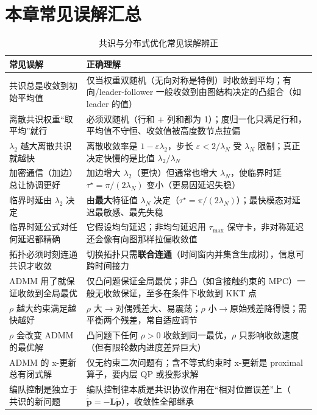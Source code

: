 \section*{本章常见误解汇总}

\begin{table}[H]\centering\small
\caption{共识与分布式优化常见误解辨正}
\label{tab:cs-misconceptions}
\begin{tabular}{p{6.0cm}p{8.2cm}}
\toprule
常见误解 & 正确理解 \\
\midrule
共识总是收敛到初始平均值 & 仅当权重双随机（无向对称是特例）时收敛到平均；有向/leader-follower 一般收敛到由图结构决定的凸组合（如 leader 的值） \\
离散共识权重“取平均”就行 & 必须双随机（行和 + 列和都为 1）；度归一化只满足行和，平均值不守恒、收敛值被高度数节点拉偏 \\
$\lambda_2$ 越大离散共识就越快 & 离散收敛率是 $1-\varepsilon\lambda_2$，步长 $\varepsilon<2/\lambda_N$ 受 $\lambda_N$ 限制；真正决定快慢的是比值 $\lambda_2/\lambda_N$ \\
加密通信（加边）总让协调更好 & 加边增大 $\lambda_2$（更快）但通常也增大 $\lambda_N$，使临界时延 $\tau^\star=\pi/(2\lambda_N)$ 变小（更易因延迟失稳） \\
临界时延由 $\lambda_2$ 决定 & 由\textbf{最大}特征值 $\lambda_N$ 决定（$\tau^\star=\pi/(2\lambda_N)$）；最快模态对延迟最敏感、最先失稳 \\
临界时延公式对任何延迟都精确 & 它假设均匀延迟；非均匀延迟用 $\tau_{\max}$ 保守卡，非对称延迟还会像有向图那样拉偏收敛值 \\
拓扑必须时刻连通共识才收敛 & 切换拓扑只需\textbf{联合连通}（时间窗内并集含生成树），信息可跨时间接力 \\
ADMM 用了就保证收敛到全局最优 & 仅凸问题保证全局最优；非凸（如含接触约束的 MPC）一般无收敛保证，至多在条件下收敛到 KKT 点 \\
$\rho$ 越大约束满足越快越好 & $\rho$ 大$\to$对偶残差大、易震荡；$\rho$ 小$\to$原始残差降得慢；需平衡两个残差，常自适应调节 \\
$\rho$ 会改变 ADMM 的最优解 & 凸问题下任何 $\rho>0$ 收敛到同一最优，$\rho$ 只影响收敛速度（但有限轮数内进度差异巨大） \\
ADMM 的 x-更新总有闭式解 & 仅无约束二次问题有；含不等式约束时 x-更新是 proximal 算子，要内层 QP 或投影求解 \\
编队控制是独立于共识的新问题 & 编队控制律本质是共识协议作用在“相对位置误差”上（$\dot{\tilde{\mathbf{p}}}=-\mathbf{L}\tilde{\mathbf{p}}$），收敛性全部继承 \\

\end{tabular}
\end{table}
